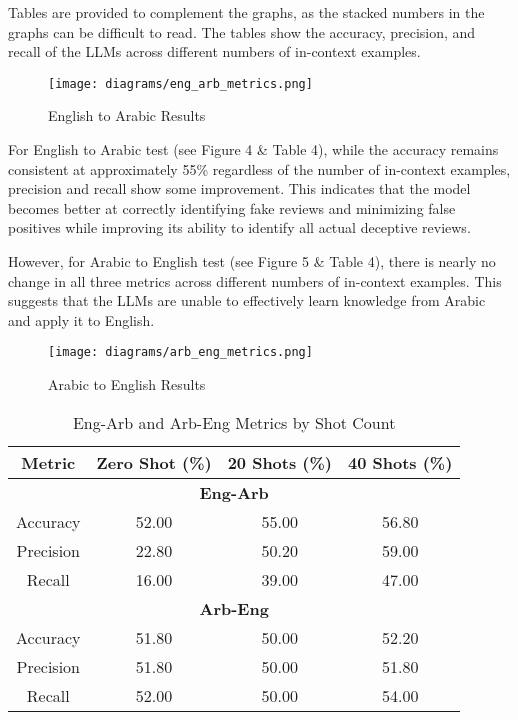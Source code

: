 \documentclass[sigconf, nonacm]{acmart}
\theoremstyle{definition}
\begin{document}
Tables are provided to complement the graphs, as the stacked numbers in the graphs can be difficult to read. The tables show the accuracy, precision, and recall of the LLMs across different numbers of in-context examples.

\begin{figure}[h]
  \centering
  \texttt{[image: diagrams/eng\_arb\_metrics.png]}
  \caption{English to Arabic Results}
\end{figure}

For English to Arabic test (see Figure 4 \& Table 4), while the accuracy remains consistent at approximately 55\% regardless of the number of in-context examples, precision and recall show some improvement. This indicates that the model becomes better at correctly identifying fake reviews and minimizing false positives while improving its ability to identify all actual deceptive reviews.

However, for Arabic to English test (see Figure 5 \& Table 4), there is nearly no change in all three metrics across different numbers of in-context examples. This suggests that the LLMs are unable to effectively learn knowledge from Arabic and apply it to English.

\begin{figure}[h]
  \centering
  \texttt{[image: diagrams/arb\_eng\_metrics.png]}
  \caption{Arabic to English Results}
\end{figure}

\begin{table}[h!]
  \centering
  \caption{Eng-Arb and Arb-Eng Metrics by Shot Count}
  \begin{tabular}{c c c c}
    \toprule
    \textbf{Metric} & \textbf{Zero Shot (\%)} & \textbf{20 Shots (\%)} & \textbf{40 Shots (\%)} \\
    \midrule
    \multicolumn{4}{c}{\textbf{Eng-Arb}}                                                        \\
    \midrule
    Accuracy        & 52.00                   & 55.00                  & 56.80                  \\
    Precision       & 22.80                   & 50.20                  & 59.00                  \\
    Recall          & 16.00                   & 39.00                  & 47.00                  \\
    \midrule
    \multicolumn{4}{c}{\textbf{Arb-Eng}}                                                        \\
    \midrule
    Accuracy        & 51.80                   & 50.00                  & 52.20                  \\
    Precision       & 51.80                   & 50.00                  & 51.80                  \\
    Recall          & 52.00                   & 50.00                  & 54.00                  \\
    \bottomrule
  \end{tabular}
\end{table}
\end{document}
